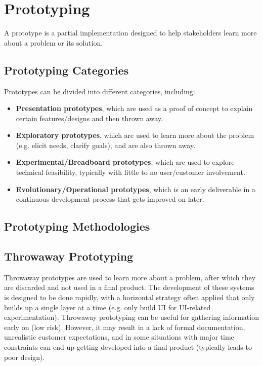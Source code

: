 \documentclass[12pt,titlepage]{article}
\begin{document}
  \section{Prototyping}
    A prototype is a partial implementation designed to help stakeholders learn more about a problem or its solution.

    \subsection{Prototyping Categories}
      Prototypes can be divided into different categories, including:
      \begin{itemize}
        \item \textbf{Presentation prototypes}, which are used as a proof of concept to explain certain features/designs and then thrown away.
        \item \textbf{Exploratory prototypes}, which are used to learn more about the problem (e.g. elicit needs, clarify goals), and are also thrown away.
        \item \textbf{Experimental/Breadboard prototypes}, which are used to explore technical feasibility, typically with little to no user/customer involvement.
        \item \textbf{Evolutionary/Operational prototypes}, which is an early deliverable in a continuous development process that gets improved on later.
      \end{itemize}

    \subsection{Prototyping Methodologies}

      \subsection{Throwaway Prototyping}
        Throwaway prototypes are used to learn more about a problem, after which they are discarded and not used in a final product. The development of these systems is designed to be
        done rapidly, with a horizontal strategy often applied that only builds up a single layer at a time (e.g. only build UI for UI-related experimentation). Throwaway prototyping can
        be useful for gathering information early on (low risk). However, it may result in a lack of formal documentation, unrealistic customer expectations, and in some situations with
        major time constraints can end up getting developed into a final product (typically leads to poor design).
\end{document}
